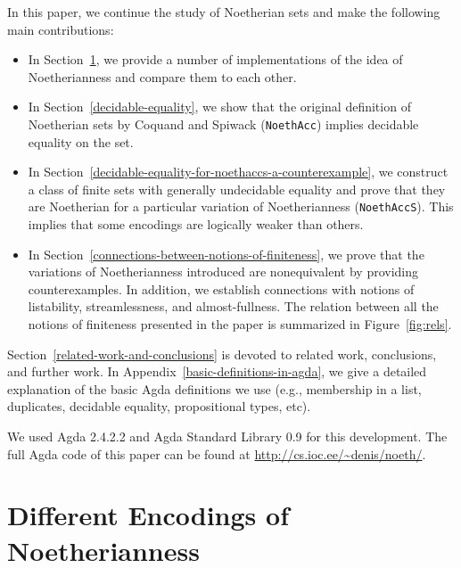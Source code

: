 \documentclass{eptcs}
\begin{document}
In this paper, we continue the study of Noetherian sets and make the following
main contributions:
\begin{itemize}
\item In Section~\ref{different-encodings-of-noetherianness}, we provide a number of
implementations of the idea of Noetherianness and compare them to each other.

\item In Section~\ref{decidable-equality}, we show that the original definition
  of Noetherian sets by Coquand and Spiwack \cite{Coquand} (\verb;NoethAcc;) implies decidable
  equality on the set.

\item In Section~\ref{decidable-equality-for-noethaccs-a-counterexample}, we
  construct a class of finite sets with generally undecidable equality and prove that they are
  Noetherian for a particular variation of Noetherianness (\verb;NoethAccS;). This
  implies that some encodings are logically weaker than others.

\item In Section~\ref{connections-between-notions-of-finiteness}, we
  prove that the variations of Noetherianness introduced are
  nonequivalent by providing counterexamples. In addition, we establish
  connections with notions of listability, streamlessness, and
  almost-fullness. The relation between all the notions of finiteness
  presented in the paper is summarized in Figure~\ref{fig:rels}.
\end{itemize}
Section~\ref{related-work-and-conclusions} is devoted to related work,
conclusions, and further work. In Appendix~\ref{basic-definitions-in-agda}, we
give a detailed explanation of the basic Agda definitions we use (e.g., membership in a list,
duplicates, decidable equality, propositional types, etc). 

We used Agda 2.4.2.2 and Agda Standard Library 0.9 for this development. The
full Agda code of this paper can be found at
\url{http://cs.ioc.ee/~denis/noeth/}.



\section{Different Encodings of Noetherianness}
\label{different-encodings-of-noetherianness}
\end{document}
